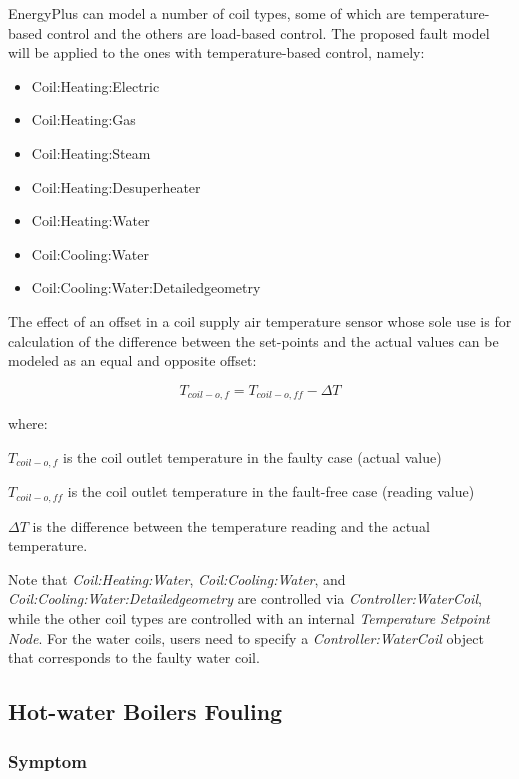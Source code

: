 EnergyPlus can model a number of coil types, some of which are temperature-based control and the others are load-based control. The proposed fault model will be applied to the ones with temperature-based control, namely:

\begin{itemize}
\tightlist
\item
  Coil:Heating:Electric
\item
  Coil:Heating:Gas
\item
  Coil:Heating:Steam
\item
  Coil:Heating:Desuperheater
\item
  Coil:Heating:Water
\item
  Coil:Cooling:Water
\item
  Coil:Cooling:Water:Detailedgeometry
\end{itemize}

The effect of an offset in a coil supply air temperature sensor whose sole use is for calculation of the difference between the set-points and the actual values can be modeled as an equal and opposite offset:

\begin{equation}
T_{coil-o,f} = T_{coil-o,ff} - \Delta T
\end{equation}

where:

\(T_{coil-o,f}\) is the coil outlet temperature in the faulty case (actual value)

\(T_{coil-o,ff}\) is the coil outlet temperature in the fault-free case (reading value)

\(\Delta T\) is the difference between the temperature reading and the actual temperature.

Note that \emph{Coil:Heating:Water}, \emph{Coil:Cooling:Water}, and \emph{Coil:Cooling:Water:Detailedgeometry} are controlled via \emph{Controller:WaterCoil}, while the other coil types are controlled with an internal \emph{Temperature Setpoint Node}. For the water coils, users need to specify a \emph{Controller:WaterCoil} object that corresponds to the faulty water coil.


\subsection{Hot-water Boilers Fouling}\label{hot-water-boiler-fouling}

\subsubsection{Symptom}

